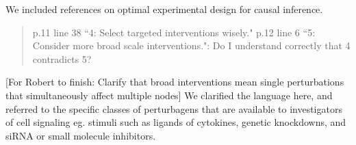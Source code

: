 \documentclass{letter}[11]
\def\todo#1{{\color{red}[For Robert to finish: #1]}}
\def\r#1{{\begin{quote}\textsf{\color{blue} #1}\end{quote}}}
\begin{document}
We included references on optimal experimental design for causal inference.                                                                                                                                          



\r{p.11 line 38 ``4: Select targeted interventions wisely." p.12 line 6 ``5: Consider more broad scale interventions.": Do I understand correctly that 4 contradicts 5?}

\todo{Clarify that broad interventions mean single perturbations that simultaneously affect multiple nodes}
We clarified the language here, and referred to the specific classes of perturbagens that are available to investigators of cell signaling eg.  stimuli such as ligands of cytokines, genetic knockdowns, and siRNA or small molecule inhibitors.

\end{document}
